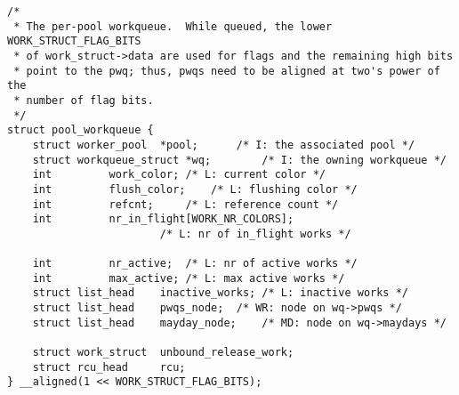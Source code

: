 
\begin{lstlisting}
/*
 * The per-pool workqueue.  While queued, the lower WORK_STRUCT_FLAG_BITS
 * of work_struct->data are used for flags and the remaining high bits
 * point to the pwq; thus, pwqs need to be aligned at two's power of the
 * number of flag bits.
 */
struct pool_workqueue {
	struct worker_pool	*pool;		/* I: the associated pool */
	struct workqueue_struct *wq;		/* I: the owning workqueue */
	int			work_color;	/* L: current color */
	int			flush_color;	/* L: flushing color */
	int			refcnt;		/* L: reference count */
	int			nr_in_flight[WORK_NR_COLORS];
						/* L: nr of in_flight works */

	int			nr_active;	/* L: nr of active works */
	int			max_active;	/* L: max active works */
	struct list_head	inactive_works;	/* L: inactive works */
	struct list_head	pwqs_node;	/* WR: node on wq->pwqs */
	struct list_head	mayday_node;	/* MD: node on wq->maydays */

	struct work_struct	unbound_release_work;
	struct rcu_head		rcu;
} __aligned(1 << WORK_STRUCT_FLAG_BITS);
\end{lstlisting}
